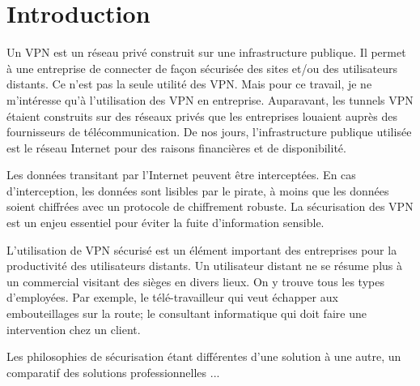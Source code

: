 \chapter*{Introduction}
Un VPN est un réseau privé construit sur une infrastructure publique. 
Il permet à une entreprise de connecter de façon sécurisée des sites et/ou des utilisateurs distants.
Ce n'est pas la seule utilité des VPN. 
Mais pour ce travail, je ne m'intéresse qu'à l'utilisation des VPN en entreprise.
Auparavant, les tunnels VPN étaient construits sur des réseaux privés que les entreprises louaient auprès des fournisseurs de télécommunication.
De nos jours, l'infrastructure publique utilisée est le réseau Internet pour des raisons financières et de disponibilité.

Les données transitant par l'Internet peuvent être interceptées.
En cas d'interception, les données sont lisibles par le pirate, à moins que les données soient chiffrées avec un protocole de chiffrement robuste.
La sécurisation des VPN est un enjeu essentiel pour éviter la fuite d'information sensible.

L'utilisation de VPN sécurisé est un élément important des entreprises pour la productivité des utilisateurs distants. 
Un utilisateur distant ne se résume plus à un commercial visitant des sièges en divers lieux.
On y trouve tous les types d'employées. Par exemple, le télé-travailleur qui veut échapper aux embouteillages sur la route; le consultant informatique qui doit faire une intervention chez un client.

Les philosophies de sécurisation étant différentes d'une solution à une autre, un comparatif des solutions professionnelles ... 